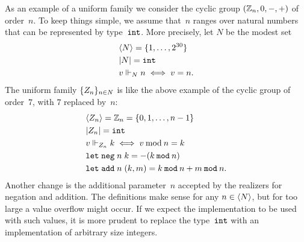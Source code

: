 As an example of a uniform family we consider the cyclic group
$(\mathbb{Z}_n, 0, {-}, {+})$ of order~$n$. To keep things simple, we assume
that~$n$ ranges over natural numbers that can be represented by
type~$\mathtt{int}$. More precisely, let $N$ be the modest set
%
\begin{align*}
  & \langle N \rangle = \{1, \ldots, 2^{30}\} \\
  & |N| = \mathtt{int} \\
  & v \Vdash_N n \iff v = n.
\end{align*}
%
The uniform family $\{Z_n\}_{n \in N}$ is like the above example
of the cyclic group of order~$7$, with $7$ replaced by~$n$:
%
\begin{align*}
  & \langle Z_n \rangle = \mathbb{Z}_n = \{0, 1, \ldots, n - 1\}
  \\
  & |Z_n| = \mathtt{int}
  \\
  & v \Vdash_{Z_n} k \iff v \mathbin{\mathrm{mod}} n = k
  \\
  & \mathtt{let}\;\mathtt{neg} \; n \; k  = - (k \mathbin{\mathtt{mod}} n)
  \\
  & \mathtt{let}\;\mathtt{add} \; n \; (k,m) = k \mathbin{\mathtt{mod}} n + m \mathbin{\mathtt{mod}} n.
\end{align*}
%
Another change is the additional parameter~$n$ accepted by the
realizers for negation and addition. The definitions make sense for
any $n \in \langle N \rangle$, but for too large a value overflow might occur.
If we expect the implementation to be used with such values, it is
more prudent to replace the type~$\mathtt{int}$ with an implementation of
arbitrary size integers.

